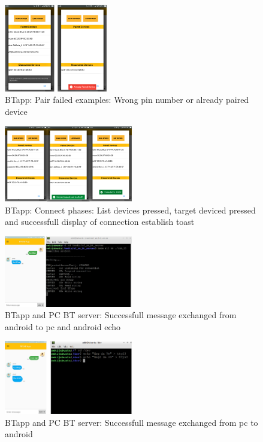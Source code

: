 %
\begin{figure}[!hbt]
\centering
\includegraphics[width=0.4\textwidth]{img/bt_failed_pair.png}
\caption{\label{fig:bt_failed_pair}BTapp: Pair failed examples: Wrong pin number or already paired device}
\end{figure}
%
\begin{figure}[!hbt]
\centering
\includegraphics[width=0.5\textwidth]{img/bt_sequence_connect.png}
\caption{\label{fig:bt_sequence_connect}BTapp: Connect phases: List devices pressed, target deviced pressed and successfull display of connection establish toast}
\end{figure}
%
\begin{figure}[!hbt]
\centering
\includegraphics[width=0.5\textwidth]{img/bt_sendapp_recpc.png}
\caption{\label{fig:bt_sendapp_recpc}BTapp and PC BT server: Successfull message exchanged from android to pc and android echo}
\end{figure}
%
\begin{figure}[!hbt]
\centering
\includegraphics[width=0.5\textwidth]{img/bt_sendPC_recAPP.png}
\caption{\label{fig:bt_sendPC_recAPP}BTapp and PC BT server: Successfull message exchanged from pc to android}
\end{figure}

